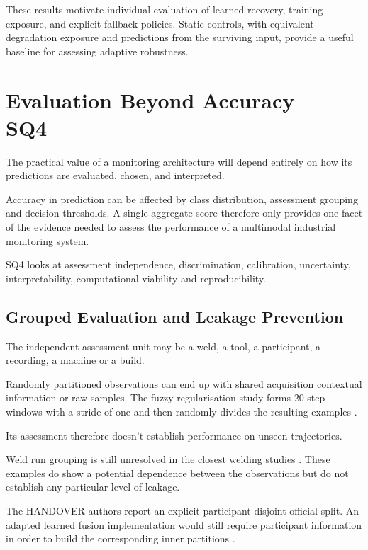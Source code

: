 These results motivate individual evaluation of learned recovery, training exposure, and explicit
fallback policies. Static controls, with equivalent degradation exposure and predictions from the
surviving input, provide a useful baseline for assessing adaptive robustness.

\section{Evaluation Beyond Accuracy --- SQ4}

The practical value of a monitoring architecture will depend entirely on how its predictions are
evaluated, chosen, and interpreted.

Accuracy in prediction can be affected by class distribution, assessment grouping and decision
thresholds. A single aggregate score therefore only provides one facet of the evidence needed to
assess the performance of a multimodal industrial monitoring system.

SQ4 looks at assessment independence, discrimination, calibration, uncertainty, interpretability,
computational viability and reproducibility.

\subsection{Grouped Evaluation and Leakage Prevention}

The independent assessment unit may be a weld, a tool, a participant, a recording, a machine or a
build.

Randomly partitioned observations can end up with shared acquisition contextual information or raw
samples. The fuzzy-regularisation study forms 20-step windows with a stride of one and then randomly
divides the resulting examples \parencite[PDF pp.~4--5]{Altinses2023Fuzzy}.

Its assessment therefore doesn't establish performance on unseen trajectories.

Weld run grouping is still unresolved in the closest welding studies \parencite{P003,Hua2026Weld}. These
examples do show a potential dependence between the observations but do not establish any particular
level of leakage.

The HANDOVER authors report an explicit participant-disjoint official split. An adapted learned
fusion implementation would still require participant information in order to build the
corresponding inner partitions \parencite{Thoduka2024Handover}.

